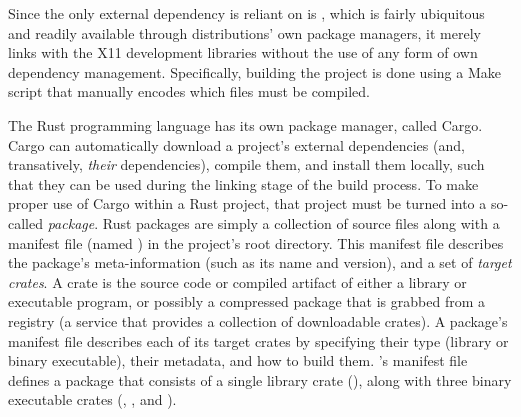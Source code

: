Since the only external dependency \wmcpp is reliant on is , which
is fairly ubiquitous and readily available through distributions' own package
managers, it merely links with the X11 development libraries without the use
of any form of own dependency management. Specifically, building the project
is done using a \textup{Make} script that manually encodes which files must be
compiled.





The Rust programming language has its own package manager, called
\textup{Cargo}. \textup{Cargo} can automatically download a project's external
dependencies (and, transatively, \textit{their} dependencies), compile them, and
install them locally, such that they can be used during the linking stage of the
build process\cite{thecargobook}. To make proper use of \textup{Cargo} within
a Rust project, that project must be turned into a so-called \textit{package}.
Rust packages are simply a collection of source files along with a manifest
file (named ) in the project's root directory. This manifest
file describes the package's meta-information (such as its name and version),
and a set of \textit{target crates}\cite{thecargobook}. A crate is the source
code or compiled artifact of either a library or executable program, or possibly
a compressed package that is grabbed from a registry (a service that provides
a collection of downloadable crates)\cite{thecargobook}. A package's manifest
file describes each of its target crates by specifying their type (library or
binary executable), their metadata, and how to build them\cite{thecargobook}.
\wmrs's manifest file defines a package that consists of a single library
crate (), along with three binary executable crates (,
, and ).



